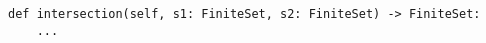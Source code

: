 \begin{verbatim}
def intersection(self, s1: FiniteSet, s2: FiniteSet) -> FiniteSet:
    ...
\end{verbatim}